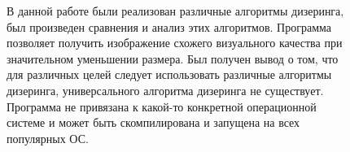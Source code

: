 \Conclusion %

\begin{figure}
В данной работе были реализован различные алгоритмы дизеринга, был произведен сравнения и анализ этих алгоритмов. Программа позволяет получить изображение схожего визуального качества при значительном уменьшении размера. Был получен вывод о том, что для различных целей следует использовать различные алгоритмы дизеринга, универсального алгоритма дизеринга не существует. Программа не привязана к какой-то конкретной
операционной системе и может быть скомпилирована и запущена на
всех популярных ОС.
\end{figure}
